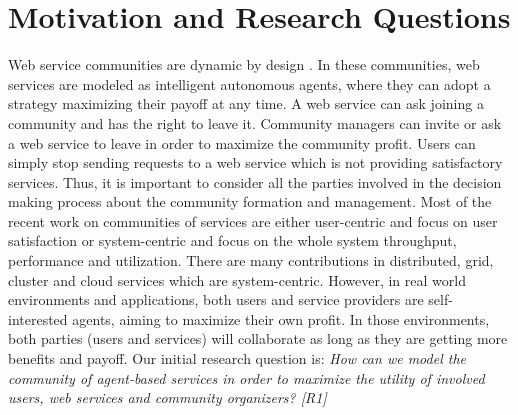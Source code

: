 \section{Motivation and Research Questions}\label{sec:researchquestions}

Web service communities are dynamic by design
\cite{DBLP:journals/ijebr/MaamarSTBB09}. In these communities, web
services are modeled as intelligent autonomous agents, where they
can adopt a strategy maximizing their payoff at any time. A web
service can ask joining a community and has the right to leave it.
Community managers can invite or ask a web service to leave in
order to maximize the community profit. Users can simply stop
sending requests to a web service which is not providing
satisfactory services. Thus, it is important to consider all the
parties involved in the decision making process about the
community formation and management. Most of the recent work on communities of
services are either user-centric and focus on user satisfaction
\cite{Chun02user-centricperformance} or system-centric and focus
on the whole system throughput, performance and utilization. There
are many contributions in distributed, grid, cluster and cloud
services which are system-centric. However, in real world
environments and applications, both users and service providers
are self-interested agents, aiming to maximize their own profit.
In those environments, both parties (users and services) will
collaborate as long as they are getting more benefits and payoff.
Our initial research question is: \emph{How can we model the
community of agent-based services in order to maximize the utility
of involved users, web services and community organizers? [R1]}


